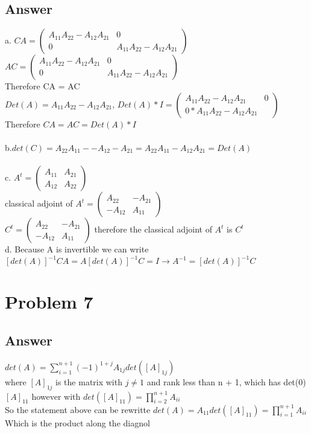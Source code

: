 \documentclass{article}
\begin{document}
\subsection*{Answer}
a. \(CA = \begin{pmatrix} A_{11}A_{22} - A_{12}A_{21} & 0 \\ 0 & A_{11}A_{22}-A_{12}A_{21} \end{pmatrix}\)
\\  \(AC = \begin{pmatrix} A_{11}A_{22} - A_{12}A_{21} & 0 \\ 0 & A_{11}A_{22}-A_{12}A_{21} \end{pmatrix}\)
\\  Therefore CA = AC
\\  \(Det(A) = A_{11}A_{22} - A_{12}A_{21}\), \(Det(A)*I = \begin{pmatrix} A_{11}A_{22} - A_{12}A_{21} & 0 \\ 0 * A_{11}A_{22}-A_{12}A_{21} \end{pmatrix}\)
\\  Therefore \(CA = AC = Det(A)*I  \)
\\ \\ b.\(det(C) = A_{22}A_{11} - -A_{12}-A_{21} = A_{22}A_{11} - A_{12}A_{21} = Det(A) \)
\\ \\ c. \(A^{t} = \begin{pmatrix} A_{11} & A_{21} \\ A_{12} & A_{22} \end{pmatrix}\)
\\ classical adjoint of \(A^{t} = \begin{pmatrix} A_{22} & - A_{21} \\ -A_{12} & A_{11} \end{pmatrix} \)
\\ \(C^{t} = \begin{pmatrix} A_{22} & -A_{21} \\ -A_{12} & A_{11} \end{pmatrix}\)
therefore the classical adjoint of \(A^{t}\) is \(C^{t}\)
\\ d. Because A is invertible we can write \([det(A)]^{-1}CA = A[det(A)]^{-1}C = I \rightarrow A^{-1} = [det(A)]^{-1} C\)
\section*{Problem 7}
\subsection*{Answer}
\(det(A) = \sum\limits_{i=1}^{n+1}(-1)^{1+j}A_{1j}det([A]_{1j})\)
\\where \([A]_{1j}\) is the matrix with \(j \ne 1\) and rank less than n + 1, which has det(0)
\\\([A]_{11}\) however with \(det([A]_{11}) = \prod\limits_{i=2}^{n+1}A_{ii}\)
\\So the statement above can be rewritte \(det(A) = A_{11}det([A]_{11}) = \prod\limits_{i=1}^{n+1}A_{ii}\)
\\Which is the product along the diagnol
\end{document}
